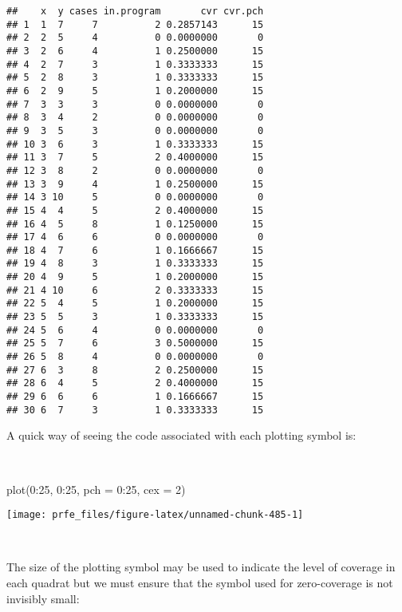 \documentclass[
  12pt,
  a4paper]{book}
\newenvironment{Shaded}{\begin{snugshade}}{\end{snugshade}}
\newcommand{\AttributeTok}[1]{\textcolor[rgb]{0.77,0.63,0.00}{#1}}
\newcommand{\DecValTok}[1]{\textcolor[rgb]{0.00,0.00,0.81}{#1}}
\newcommand{\FunctionTok}[1]{\textcolor[rgb]{0.00,0.00,0.00}{#1}}
\newcommand{\NormalTok}[1]{#1}
\newcommand{\SpecialCharTok}[1]{\textcolor[rgb]{0.00,0.00,0.00}{#1}}
\begin{document}
\begin{verbatim}
##    x  y cases in.program       cvr cvr.pch
## 1  1  7     7          2 0.2857143      15
## 2  2  5     4          0 0.0000000       0
## 3  2  6     4          1 0.2500000      15
## 4  2  7     3          1 0.3333333      15
## 5  2  8     3          1 0.3333333      15
## 6  2  9     5          1 0.2000000      15
## 7  3  3     3          0 0.0000000       0
## 8  3  4     2          0 0.0000000       0
## 9  3  5     3          0 0.0000000       0
## 10 3  6     3          1 0.3333333      15
## 11 3  7     5          2 0.4000000      15
## 12 3  8     2          0 0.0000000       0
## 13 3  9     4          1 0.2500000      15
## 14 3 10     5          0 0.0000000       0
## 15 4  4     5          2 0.4000000      15
## 16 4  5     8          1 0.1250000      15
## 17 4  6     6          0 0.0000000       0
## 18 4  7     6          1 0.1666667      15
## 19 4  8     3          1 0.3333333      15
## 20 4  9     5          1 0.2000000      15
## 21 4 10     6          2 0.3333333      15
## 22 5  4     5          1 0.2000000      15
## 23 5  5     3          1 0.3333333      15
## 24 5  6     4          0 0.0000000       0
## 25 5  7     6          3 0.5000000      15
## 26 5  8     4          0 0.0000000       0
## 27 6  3     8          2 0.2500000      15
## 28 6  4     5          2 0.4000000      15
## 29 6  6     6          1 0.1666667      15
## 30 6  7     3          1 0.3333333      15
\end{verbatim}

\newpage

A quick way of seeing the code associated with each plotting symbol is:

~

\begin{Shaded}
\begin{Highlighting}[]
\FunctionTok{plot}\NormalTok{(}\DecValTok{0}\SpecialCharTok{:}\DecValTok{25}\NormalTok{, }\DecValTok{0}\SpecialCharTok{:}\DecValTok{25}\NormalTok{, }\AttributeTok{pch =} \DecValTok{0}\SpecialCharTok{:}\DecValTok{25}\NormalTok{, }\AttributeTok{cex =} \DecValTok{2}\NormalTok{)}
\end{Highlighting}
\end{Shaded}

\begin{center}\texttt{[image: prfe\_files/figure-latex/unnamed-chunk-485-1]} \end{center}

~

The size of the plotting symbol may be used to indicate the level of coverage in each quadrat but we must
ensure that the symbol used for zero-coverage is not invisibly small:
\end{document}
